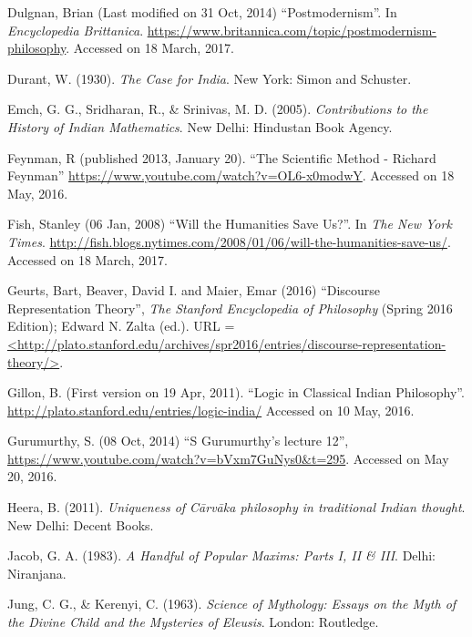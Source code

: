 \begin{thebibliography}{99}
Dulgnan, Brian (Last modified on 31 Oct, 2014) ``Postmodernism''. In {\sl Encyclopedia Brittanica}. \url{https://www.britannica.com/topic/postmodernism-philosophy}.  Accessed on 18 March, 2017.

Durant, W. (1930). {\sl The Case for India}. New York: Simon and Schuster.

Emch, G. G., Sridharan, R., \& Srinivas, M. D. (2005). {\sl Contributions to the History of Indian Mathematics}. New Delhi: Hindustan Book Agency.

Feynman, R (published 2013, January 20). ``The Scientific Method - Richard Feynman'' \url{https://www.youtube.com/watch?v=OL6-x0modwY}. Accessed on 18 May, 2016.

Fish, Stanley (06 Jan, 2008) ``Will the Humanities Save Us?''. In {\sl The New York Times}. \url{http://fish.blogs.nytimes.com/2008/01/06/will-the-humanities-save-us/}. Accessed on 18 March, 2017.

Geurts, Bart, Beaver, David I. and Maier, Emar (2016) ``Discourse Representation Theory'', {\sl The Stanford Encyclopedia of Philosophy} (Spring 2016 Edition); Edward N. Zalta (ed.). URL = \url{<http://plato.stanford.edu/archives/spr2016/entries/discourse-representation-theory/>}.

Gillon, B. (First version on 19 Apr, 2011). ``Logic in Classical Indian Philosophy''. \url{http://plato.stanford.edu/entries/logic-india/} Accessed on 10 May, 2016.

Gurumurthy, S. (08 Oct, 2014) ``S Gurumurthy's lecture 12'', \url{https://www.youtube.com/watch?v=bVxm7GuNys0&t=295}. Accessed on May 20, 2016. 

Heera, B. (2011). {\sl Uniqueness of Cārvāka philosophy in traditional Indian thought}. New Delhi: Decent Books.



Jacob, G. A. (1983). {\sl A Handful of Popular Maxims: Parts I, II \& III}. Delhi: Niranjana.

Jung, C. G., \& Kerenyi, C. (1963). {\sl Science of Mythology: Essays on the Myth of the Divine Child and the Mysteries of Eleusis}. London: Routledge. 


\end{thebibliography}
